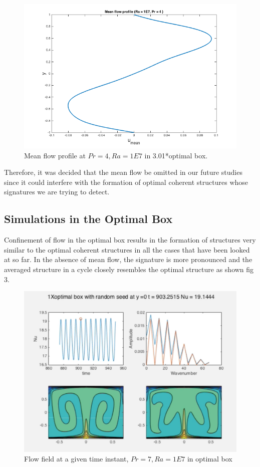 \documentclass[12pt]{article}
\begin{document}
     \begin{figure}[!htb]
     	\includegraphics[width=\linewidth]{umean.png}
     	\caption{Mean flow profile at $Pr = 4, Ra = 1E7$ in 3.01*optimal box.}
     	\label{fig:fig1}
     \end{figure}
     
     Therefore, it was decided that the mean flow be omitted in our future studies since it could interfere with the formation of optimal coherent structures whose signatures we are trying to detect.
     
      \subsection{Simulations in the Optimal Box}
      
      Confinement of flow in the optimal box results in the formation of structures very similar to the optimal coherent structures in all the cases that have been looked at so far. In the absence of mean flow, the signature is more pronounced and the averaged structure in a cycle closely resembles the optimal structure as shown fig 3.
      
      \begin{figure}[!htb]
      	\includegraphics[width=\linewidth]{1E7opt.png}
      	\caption{Flow field at a given time instant, $Pr = 7, Ra = 1E7$ in optimal box}
      	\label{fig:fig3}
      \end{figure}
      
\end{document}
